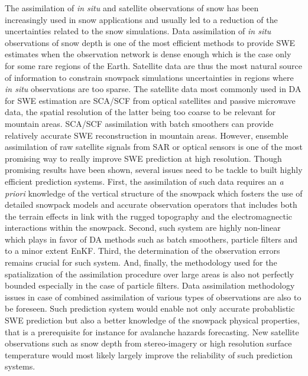 \documentclass[utf8]{frontiersSCNS} %
\begin{document}
The assimilation of \textit{in situ} and satellite observations of snow has been increasingly used in snow applications and usually led to a reduction of the uncertainties related to the snow simulations. Data assimilation of \textit{in situ} observations of snow depth is one of the most efficient methods to provide SWE estimates when the observation network is dense enough which is the case only for some rare regions of the Earth. Satellite data are thus the most natural source of information to constrain snowpack simulations uncertainties in regions where \textit{in situ} observations are too sparse. The satellite data most commonly used in DA for SWE estimation are SCA/SCF from optical satellites and passive microwave data, the spatial resolution of the latter being too coarse to be relevant for mountain areas. SCA/SCF assimilation with batch smoothers can provide relatively accurate SWE reconstruction in mountain areas. However, ensemble assimilation of raw satellite signals from SAR or optical sensors is one of the most promising way to really improve SWE prediction at high resolution. Though promising results have been shown, several issues need to be tackle to built highly efficient prediction systems. First, the assimilation of such data requires an \textit{a priori} knowledge of the vertical structure of the snowpack which fosters the use of detailed snowpack models and accurate observation operators that includes both the terrain effects in link with the rugged topography and the electromagnectic interactions within the snowpack. Second, such system are highly non-linear which plays in favor of DA methods such as batch smoothers, particle filters and to a minor extent EnKF. Third, the determination of the observation errors remains crucial for such system. And, finally, the methodology used for the spatialization of the assimilation procedure over large areas is also not perfectly bounded especially in the case of particle filters. Data assimilation methodology issues in case of combined assimilation of various types of observations are also to be foreseen. Such prediction system would enable not only accurate probablistic SWE prediction but also a better knowledge of the snowpack physical properties, that is a prerequisite for instance for avalanche hazards forecasting. New satellite observations such as snow depth from stereo-imagery \citep{Margulis_2019} or high resolution surface temperature would most likely largely improve the reliability of such prediction systems.  
\end{document}
